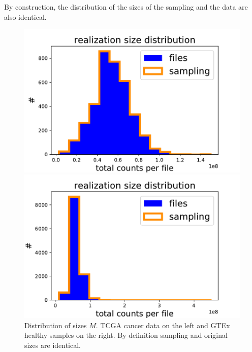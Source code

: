 By construction, the distribution of the sizes of the sampling and the data are also identical.
\begin{figure}[htb!]
\begin{minipage}{0.5\textwidth}
    \centering
    \includegraphics[width=0.95\linewidth]{pictures/structure/tcga/sizeDistr_null.pdf}
\end{minipage}
\hspace{2mm}
\begin{minipage}{0.5\textwidth}
    \centering
    \includegraphics[width=0.95\linewidth]{pictures/structure/gtex/sizeDistr_null.pdf}
    \end{minipage}
\caption{Distribution of sizes $M$. TCGA cancer data on the left and GTEx healthy samples on the right. By definition sampling and original sizes are identical.}
    \label{fig:structure/sizeDistr_null}
\end{figure}

